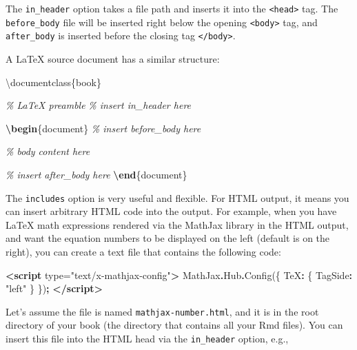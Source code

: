 \documentclass[
  12pt,
]{krantz}
\newenvironment{Shaded}{\begin{snugshade}}{\end{snugshade}}
\newcommand{\AttributeTok}[1]{\textcolor[rgb]{0.77,0.63,0.00}{#1}}
\newcommand{\BuiltInTok}[1]{#1}
\newcommand{\CommentTok}[1]{\textcolor[rgb]{0.56,0.35,0.01}{\textit{#1}}}
\newcommand{\DataTypeTok}[1]{\textcolor[rgb]{0.13,0.29,0.53}{#1}}
\newcommand{\ExtensionTok}[1]{#1}
\newcommand{\FunctionTok}[1]{\textcolor[rgb]{0.00,0.00,0.00}{#1}}
\newcommand{\KeywordTok}[1]{\textcolor[rgb]{0.13,0.29,0.53}{\textbf{#1}}}
\newcommand{\NormalTok}[1]{#1}
\newcommand{\OperatorTok}[1]{\textcolor[rgb]{0.81,0.36,0.00}{\textbf{#1}}}
\newcommand{\OtherTok}[1]{\textcolor[rgb]{0.56,0.35,0.01}{#1}}
\newcommand{\StringTok}[1]{\textcolor[rgb]{0.31,0.60,0.02}{#1}}
\theoremstyle{definition}
\theoremstyle{definition}
\theoremstyle{definition}
\theoremstyle{definition}
\theoremstyle{remark}
\begin{document}
The \texttt{in\_header} option takes a file path and inserts it into the \texttt{\textless{}head\textgreater{}} tag. The \texttt{before\_body} file will be inserted right below the opening \texttt{\textless{}body\textgreater{}} tag, and \texttt{after\_body} is inserted before the closing tag \texttt{\textless{}/body\textgreater{}}.

A LaTeX source document has a similar structure:

\begin{Shaded}
\begin{Highlighting}[]
\BuiltInTok{\textbackslash{}documentclass}\NormalTok{\{}\ExtensionTok{book}\NormalTok{\}}

\CommentTok{\% LaTeX preamble}
\CommentTok{\% insert in\_header here}

\KeywordTok{\textbackslash{}begin}\NormalTok{\{}\ExtensionTok{document}\NormalTok{\}}
\CommentTok{\% insert before\_body here}

\CommentTok{\% body content here}

\CommentTok{\% insert after\_body here}
\KeywordTok{\textbackslash{}end}\NormalTok{\{}\ExtensionTok{document}\NormalTok{\}}
\end{Highlighting}
\end{Shaded}

The \texttt{includes} option is very useful and flexible. For HTML output, it means you can insert arbitrary HTML code into the output. For example, when you have LaTeX math expressions rendered via the MathJax library in the HTML output, and want the equation numbers to be displayed on the left (default is on the right), you can create a text file that contains the following code:

\begin{Shaded}
\begin{Highlighting}[]
\KeywordTok{\textless{}script}\OtherTok{ type=}\StringTok{"text/x{-}mathjax{-}config"}\KeywordTok{\textgreater{}}
\NormalTok{MathJax}\OperatorTok{.}\AttributeTok{Hub}\OperatorTok{.}\FunctionTok{Config}\NormalTok{(\{}
  \DataTypeTok{TeX}\OperatorTok{:}\NormalTok{ \{ }\DataTypeTok{TagSide}\OperatorTok{:} \StringTok{"left"}\NormalTok{ \}}
\NormalTok{\})}\OperatorTok{;}
\KeywordTok{\textless{}/script\textgreater{}}
\end{Highlighting}
\end{Shaded}

Let's assume the file is named \texttt{mathjax-number.html}, and it is in the root directory of your book (the directory that contains all your Rmd files). You can insert this file into the HTML head via the \texttt{in\_header} option, e.g.,
\end{document}
